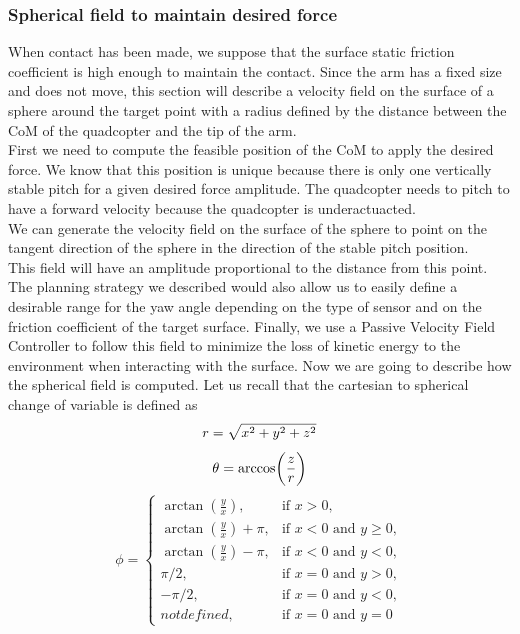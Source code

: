 \subsubsection{Spherical field to maintain desired force }
When contact has been made, we suppose that the surface static friction coefficient is high enough to maintain the contact.
Since the arm has a fixed size and does not move, this section will describe a velocity field on the surface of a sphere around the target point with a radius defined by the distance between the CoM of the quadcopter and the tip of the arm.\\
First we need to compute the feasible position of the CoM to apply the desired force. 
We know that this position is unique because there is only one vertically stable pitch for a given desired force amplitude. The quadcopter needs to pitch to have a forward velocity because the quadcopter is underactuacted.\\
We can generate the velocity field on the surface of the sphere to point on the tangent direction of the sphere in the direction of the stable pitch position. \\
This field will have an amplitude proportional to the distance from this point.
The planning strategy we described would also allow us to easily define a desirable range for the yaw angle depending on the type of sensor and on the friction coefficient of the target surface.
Finally, we use a Passive Velocity Field Controller \cite{li1999passive} to follow this field to minimize the loss of kinetic energy to the environment when interacting with the surface.
Now we are going to describe how the spherical field is computed. 
Let us recall that the cartesian to spherical change of variable is defined as
\begin{equation} 
    r = \sqrt{x^2+y^2+z^2}\\ \nonumber 
\end{equation}
\begin{equation}
    \theta = \arccos(\frac{z}{r})\\\nonumber 
\end{equation}
\begin{equation}
    \label{transformation}
    \phi =
    \begin{cases}
        \arctan(\frac{y}{x}), & \text{if $x>0$},\\
        \arctan(\frac{y}{x}) + \pi, & \text{if $x<0$ and $y\geq 0$},\\
        \arctan(\frac{y}{x}) - \pi, & \text{if $x<0$ and $y<0$},\\
        \pi/2, & \text{if $x=0$ and $y>0$},\\
        -\pi/2, & \text{if $x=0$ and $y<0$},\\
        not defined , & \text{if $x=0$ and $y=0$}
    \end{cases}       
\end{equation}  
